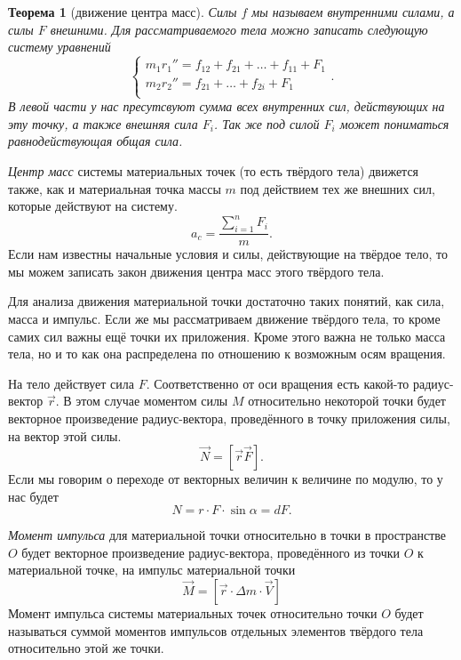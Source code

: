 \documentclass[10pt]{extbook}
\newtheorem{theorem}{Теорема}[section]
\begin{document}
\begin{theorem}[движение центра масс]
	Силы \( f \) мы называем внутренними силами, а силы \( F \) внешними. Для
	рассматриваемого тела можно записать следующую систему уравнений \[
		\begin{cases}
			m_1 r_1'' = f_{12} + f_{21} + \ldots + f_{11} + F_1 \\
			m_2 r_2'' = f_{21} + \ldots + f_{2i} + F_1          \\
		\end{cases}
		.\] В левой части у нас пресутсвуют сумма всех внутренних сил, действующих
	на эту точку, а также внешняя сила \( F_i \). Так же под силой \( F_i \)
	может пониматься равнодействующая общая сила.
\end{theorem}

\emph{Центр масс} системы материальных точек (то есть твёрдого тела) движется
также, как и материальная точка массы \( m \) под действием тех же внешних сил,
которые действуют на систему.\[
	a_c = \frac{\sum_{i=1}^{n} F_i}{m}
	.\] Если нам известны начальные условия и силы, действующие на твёрдое тело,
то мы можем записать закон движения центра масс этого твёрдого тела.

Для анализа движения материальной точки достаточно таких понятий, как сила,
масса и импульс. Если же мы рассматриваем движение твёрдого тела, то кроме
самих сил важны ещё точки их приложения. Кроме этого важна не только масса
тела, но и то как она распределена по отношению к возможным осям вращения.


На тело действует сила \( F \). Соответственно от оси вращения есть какой-то
радиус-вектор \( \vec{r} \). В этом случае моментом силы \( M \) относительно
некоторой точки будет векторное произведение радиус-вектора, проведённого в
точку приложения силы, на вектор этой силы. \[
	\vec{N} = [ \vec{r} \vec{F}]
	.\] Если мы говорим о переходе от векторных величин к величине по модулю, то
у нас будет \[
	N = r \cdot F \cdot \sin{\alpha} = d F
	.\]

\emph{Момент импульса} для материальной точки относительно в точки в
пространстве \( O \) будет векторное произведение радиус-вектора, проведённого
из точки \( O \) к материальной точке, на импульс материальной точки
\begin{equation}
	\label{eq:moment-impuls}
	\vec{M} = [\vec{r} \cdot \Delta m \cdot \vec{V}]
\end{equation}
Момент импульса системы материальных точек относительно точки \( O \)
будет называться суммой моментов импульсов отдельных элементов твёрдого тела
относительно этой же точки.
\end{document}
